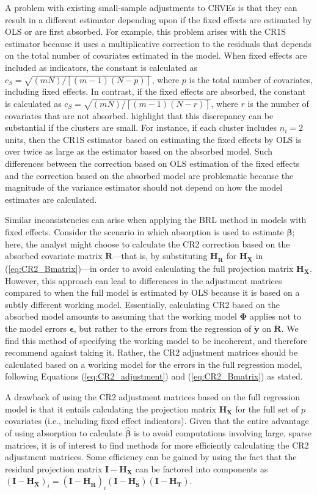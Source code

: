 \documentclass[12pt]{article}\usepackage[]{graphicx}\usepackage[]{color}
\newcommand{\bm}{\mathbf}
\newcommand{\bs}{\boldsymbol}
\begin{document}
A problem with existing small-sample adjustments to CRVEs is that they can result in a different estimator depending upon if the fixed effects are estimated by OLS or are first absorbed. 
For example, this problem arises with the CR1S estimator because it uses a multiplicative correction to the residuals that depends on the total number of covariates estimated in the model. 
When fixed effects are included as indicators, the constant is calculated as $c_S = \sqrt{(mN) / [(m - 1)(N - p)]}$, where $p$ is the total number of covariates, including fixed effects. 
In contrast, if the fixed effects are absorbed, the constant is calculated as $c_S = \sqrt{(mN) / [(m - 1)(N - r)]}$, where $r$ is the number of covariates that are not absorbed. 
\citet{Cameron2015practitioners} highlight that this discrepancy can be substantial if the clusters are small. For instance, if each cluster includes $n_i = 2$ units, then the CR1S estimator based on estimating the fixed effects by OLS is over twice as large as the estimator based on the absorbed model.
Such differences between the correction based on OLS estimation of the fixed effects and the correction based on the absorbed model are problematic because the magnitude of the variance estimator should not depend on how the model estimates are calculated. 

Similar inconsistencies can arise when applying the BRL method in models with fixed effects. 
Consider the scenario in which absorption is used to estimate $\bs\beta$; here, the analyst might choose to calculate the CR2 correction based on the absorbed covariate matrix $\bm{\ddot{R}}$---that is, by substituting $\bm{H_{\ddot{R}}}$ for $\bm{H_X}$ in (\ref{eq:CR2_Bmatrix})---in order to avoid calculating the full projection matrix $\bm{H_X}$. 
However, this approach can lead to differences in the adjustment matrices compared to when the full model is estimated by OLS because it is based on a subtly different working model. 
Essentially, calculating CR2 based on the absorbed model amounts to assuming that the working model $\bs\Phi$ applies not to the model errors $\bs\epsilon$, but rather to the errors from the regression of $\bm{\ddot{y}}$ on $\bm{\ddot{R}}$.
We find this method of specifying the working model to be incoherent, and therefore recommend against taking it.
Rather, the CR2 adjustment matrices should be calculated based on a working model for the errors in the full regression model, following Equations (\ref{eq:CR2_adjustment}) and (\ref{eq:CR2_Bmatrix}) as stated. 

A drawback of using the CR2 adjustment matrices based on the full regression model is that it entails calculating the projection matrix $\bm{H_X}$ for the full set of $p$ covariates (i.e., including fixed effect indicators). Given that the entire advantage of using absorption to calculate $\hat{\bs\beta}$ is to avoid computations involving large, sparse matrices, it is of interest to find methods for more efficiently calculating the CR2 adjustment matrices. Some efficiency can be gained by using the fact that the residual projection matrix $\bm{I} - \bm{H_X}$ can be factored into components as $\left(\bm{I} - \bm{H_X}\right)_i = \left(\bm{I} - \bm{H_{\ddot{R}}}\right)_i \left(\bm{I} - \bm{H_{\ddot{S}}}\right) \left(\bm{I} - \bm{H_T}\right)$.
\end{document}

